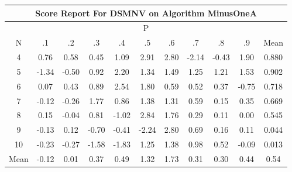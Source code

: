 \documentclass[11pt,a4paper]{report}
\begin{document}
\begin{longtable}{ | c || c | c | c | c | c | c | c | c | c || c |}
\hline
\multicolumn{11}{|c|}{ Score Report For DSMNV on Algorithm MinusOneA} \\
\hline
\multicolumn{11}{|c|}{ P } \\
\hline
N & .1 & .2 & .3 & .4 & .5 & .6 & .7 & .8 & .9 & Mean\\
 \hline
 \hline
 \endhead
  4 &  \cellcolor[HTML]{EFEFFF} 0.76 &  \cellcolor[HTML]{EFEFFF} 0.58 &  \cellcolor[HTML]{F7F7FF} 0.45 &  \cellcolor[HTML]{E7E7FF} 1.09 &  \cellcolor[HTML]{B7B7FF} 2.91 &  \cellcolor[HTML]{B7B7FF} 2.80 &  \cellcolor[HTML]{FFC7C7} -2.14 &  \cellcolor[HTML]{FFF7F7} -0.43 &  \cellcolor[HTML]{CFCFFF} 1.90 & 0.880 \\
  5 &  \cellcolor[HTML]{FFDFDF} -1.34 &  \cellcolor[HTML]{FFEFEF} -0.50 &  \cellcolor[HTML]{E7E7FF} 0.92 &  \cellcolor[HTML]{C7C7FF} 2.20 &  \cellcolor[HTML]{DFDFFF} 1.34 &  \cellcolor[HTML]{D7D7FF} 1.49 &  \cellcolor[HTML]{DFDFFF} 1.25 &  \cellcolor[HTML]{DFDFFF} 1.21 &  \cellcolor[HTML]{D7D7FF} 1.53 & 0.902 \\
  6 &  \cellcolor[HTML]{FFFFFF} 0.07 &  \cellcolor[HTML]{F7F7FF} 0.43 &  \cellcolor[HTML]{E7E7FF} 0.89 &  \cellcolor[HTML]{BFBFFF} 2.54 &  \cellcolor[HTML]{CFCFFF} 1.80 &  \cellcolor[HTML]{EFEFFF} 0.59 &  \cellcolor[HTML]{EFEFFF} 0.52 &  \cellcolor[HTML]{F7F7FF} 0.37 &  \cellcolor[HTML]{FFEFEF} -0.75 & 0.718 \\
  7 &  \cellcolor[HTML]{FFFFFF} -0.12 &  \cellcolor[HTML]{FFF7F7} -0.26 &  \cellcolor[HTML]{CFCFFF} 1.77 &  \cellcolor[HTML]{E7E7FF} 0.86 &  \cellcolor[HTML]{DFDFFF} 1.38 &  \cellcolor[HTML]{DFDFFF} 1.31 &  \cellcolor[HTML]{EFEFFF} 0.59 &  \cellcolor[HTML]{FFFFFF} 0.15 &  \cellcolor[HTML]{F7F7FF} 0.35 & 0.669 \\
  8 &  \cellcolor[HTML]{FFFFFF} 0.15 &  \cellcolor[HTML]{FFFFFF} -0.04 &  \cellcolor[HTML]{E7E7FF} 0.81 &  \cellcolor[HTML]{FFE7E7} -1.02 &  \cellcolor[HTML]{B7B7FF} 2.84 &  \cellcolor[HTML]{CFCFFF} 1.76 &  \cellcolor[HTML]{F7F7FF} 0.29 &  \cellcolor[HTML]{FFFFFF} 0.11 &  \cellcolor[HTML]{FFFFFF} 0.00 & 0.545 \\
  9 &  \cellcolor[HTML]{FFFFFF} -0.13 &  \cellcolor[HTML]{FFFFFF} 0.12 &  \cellcolor[HTML]{FFEFEF} -0.70 &  \cellcolor[HTML]{FFF7F7} -0.41 &  \cellcolor[HTML]{FFC7C7} -2.24 &  \cellcolor[HTML]{B7B7FF} 2.80 &  \cellcolor[HTML]{EFEFFF} 0.69 &  \cellcolor[HTML]{FFFFFF} 0.16 &  \cellcolor[HTML]{FFFFFF} 0.11 & 0.044 \\
  10 &  \cellcolor[HTML]{FFF7F7} -0.23 &  \cellcolor[HTML]{FFF7F7} -0.27 &  \cellcolor[HTML]{FFD7D7} -1.58 &  \cellcolor[HTML]{FFCFCF} -1.83 &  \cellcolor[HTML]{DFDFFF} 1.25 &  \cellcolor[HTML]{DFDFFF} 1.38 &  \cellcolor[HTML]{E7E7FF} 0.98 &  \cellcolor[HTML]{EFEFFF} 0.52 &  \cellcolor[HTML]{FFFFFF} -0.09 & 0.013 \\
 \hline
 \hline
Mean &  \cellcolor[HTML]{FFFFFF} -0.12 &  \cellcolor[HTML]{FFFFFF} 0.01 &  \cellcolor[HTML]{F7F7FF} 0.37 &  \cellcolor[HTML]{EFEFFF} 0.49 &  \cellcolor[HTML]{DFDFFF} 1.32 &  \cellcolor[HTML]{D7D7FF} 1.73 &  \cellcolor[HTML]{F7F7FF} 0.31 &  \cellcolor[HTML]{F7F7FF} 0.30 &  \cellcolor[HTML]{F7F7FF} 0.44 &  \cellcolor[HTML]{EFEFFF} 0.54
\end{longtable}
\end{document}
